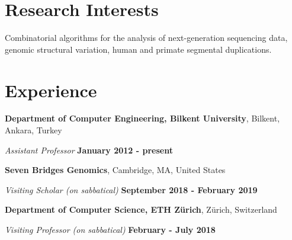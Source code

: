 \documentclass[margin,line]{res}
\begin{document}
\begin{resume}

  
  
  \section{\sc Research Interests}
  Combinatorial algorithms for the analysis of next-generation sequencing data, 
  genomic structural variation,  human and primate
  segmental duplications. %

          \section{\sc Experience}
                  {\bf Department of Computer Engineering, Bilkent University},
                  Bilkent, Ankara, Turkey
                  
                  \vspace{-.3cm}
                         {\em Assistant Professor} \hfill {\bf January 2012 - present} 

                 {\bf Seven Bridges Genomics},
                  Cambridge, MA, United States
                  
                  \vspace{-.1cm}
                         {\em Visiting Scholar (on sabbatical)} \hfill {\bf September 2018 - February 2019} 

                 {\bf Department of Computer Science, ETH Zürich},
                  Zürich, Switzerland
                  
                  \vspace{-.1cm}
                         {\em Visiting Professor (on sabbatical)} \hfill {\bf February - July 2018} 
                         

\end{resume}
\end{document}
